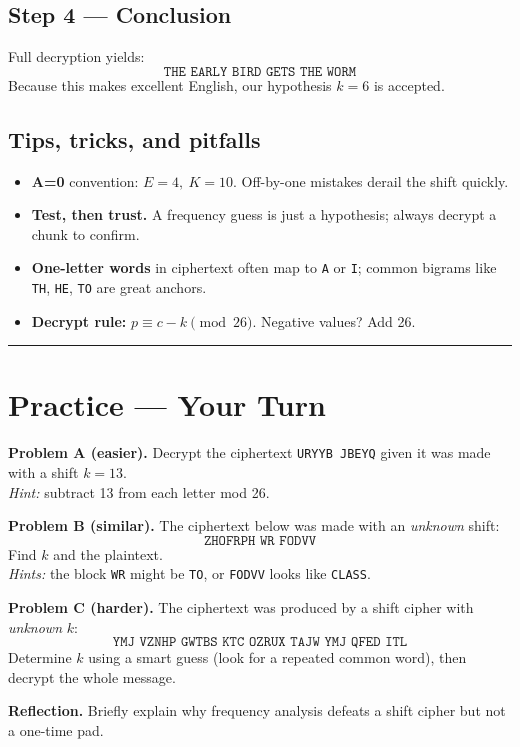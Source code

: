 \documentclass[12pt]{article}
\newcommand{\workbox}[1]{\fbox{\parbox{\dimexpr\textwidth-2\fboxsep-2\fboxrule\relax}{\vspace{#1}}}}
\begin{document}
\subsection*{Step 4 — Conclusion}
Full decryption yields:
\[
\boxed{\texttt{THE EARLY BIRD GETS THE WORM}}
\]
Because this makes excellent English, our hypothesis \(k=6\) is accepted.

\subsection*{Tips, tricks, and pitfalls}
\begin{itemize}[leftmargin=1.25em]
  \item \textbf{A=0} convention: \(E=4,\ K=10\). Off-by-one mistakes derail the shift quickly.
  \item \textbf{Test, then trust.} A frequency guess is just a hypothesis; always decrypt a chunk to confirm.
  \item \textbf{One-letter words} in ciphertext often map to \texttt{A} or \texttt{I}; common bigrams like \texttt{TH}, \texttt{HE}, \texttt{TO} are great anchors.
  \item \textbf{Decrypt rule:} \(p\equiv c-k\pmod{26}\). Negative values? Add 26.
\end{itemize}

\bigskip
\hrule
\vspace{0.5em}

\section*{Practice — Your Turn}

\textbf{Problem A (easier).} Decrypt the ciphertext \texttt{URYYB JBEYQ} given it was made with a shift \(k=13\). \\
\emph{Hint:} subtract 13 from each letter mod 26.
\workbox{2.0cm}

\textbf{Problem B (similar).} The ciphertext below was made with an \emph{unknown} shift:
\[
\texttt{ZHOFRPH WR FODVV}
\]
Find \(k\) and the plaintext. \\
\emph{Hints:} the block \texttt{WR} might be \texttt{TO}, or \texttt{FODVV} looks like \texttt{CLASS}.
\workbox{2.2cm}

\textbf{Problem C (harder).} The ciphertext was produced by a shift cipher with \emph{unknown} \(k\):
\[
\texttt{YMJ VZNHP GWTBS KTC OZRUX TAJW YMJ QFED ITL}
\]
Determine \(k\) using a smart guess (look for a repeated common word), then decrypt the whole message.
\workbox{3.0cm}

\bigskip
\textbf{Reflection.} Briefly explain why frequency analysis defeats a shift cipher but not a one-time pad.
\workbox{1.6cm}
\end{document}
